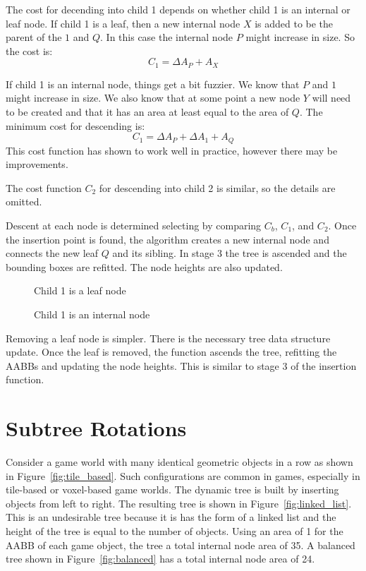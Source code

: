 \documentclass{article}
\begin{document}
The cost for decending into child 1 depends on whether child 1 is an internal or leaf node. If child 1 is a leaf, then a new internal node $X$ is added to be the parent of the $1$ and $Q$. In this case the internal node $P$ might increase in size. So the cost is:
\[ C_1 = \Delta A_P + A_X \]

If child 1 is an internal node, things get a bit fuzzier. We know that $P$ and $1$ might increase in size. We also know that at some point a new node $Y$ will need to be created and that it has an area at least equal to the area of $Q$. The minimum cost for descending is:
\[ C_1 = \Delta A_P + \Delta A_1 + A_Q \]
This cost function has shown to work well in practice, however there may be improvements.

The cost function $C_2$ for descending into child 2 is similar, so the details are omitted.

Descent at each node is determined selecting by comparing $C_b$, $C_1$, and $C_2$. Once the insertion point is found, the algorithm creates a new internal node and connects the new leaf $Q$ and its sibling. In stage 3 the tree is ascended and the bounding boxes are refitted. The node heights are also updated.

\begin{figure}
	\begin{center}
		
	\end{center}
	\caption{Child 1 is a leaf node}
	\label{fig:child1_leaf}
\end{figure}

\begin{figure}
	\begin{center}
		
	\end{center}
	\caption{Child 1 is an internal node}
	\label{fig:child1_internal}
\end{figure}

Removing a leaf node is simpler. There is the necessary tree data structure update. Once the leaf is removed, the function ascends the tree, refitting the AABBs and updating the node heights. This is similar to stage 3 of the insertion function.

\section{Subtree Rotations}

Consider a game world with many identical geometric objects in a row as shown in Figure~\ref{fig:tile_based}. Such configurations are common in games, especially in tile-based or voxel-based game worlds. The dynamic tree is built by inserting objects from left to right. The resulting tree is shown in Figure~\ref{fig:linked_list}. This is an undesirable tree because it is has the form of a linked list and the height of the tree is equal to the number of objects. Using an area of 1 for the AABB of each game object, the tree a total internal node area of 35. A balanced tree shown in Figure~\ref{fig:balanced} has a total internal node area of 24.
\end{document}
